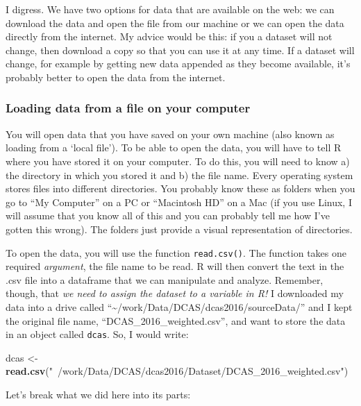 \documentclass[]{article}
\newenvironment{Shaded}{\begin{snugshade}}{\end{snugshade}}
\newcommand{\KeywordTok}[1]{\textcolor[rgb]{0.13,0.29,0.53}{\textbf{{#1}}}}
\newcommand{\StringTok}[1]{\textcolor[rgb]{0.31,0.60,0.02}{{#1}}}
\newcommand{\NormalTok}[1]{{#1}}
\begin{document}
I digress. We have two options for data that are available on the web:
we can download the data and open the file from our machine or we can
open the data directly from the internet. My advice would be this: if
you a dataset will not change, then download a copy so that you can use
it at any time. If a dataset will change, for example by getting new
data appended as they become available, it's probably better to open the
data from the internet.

\hypertarget{data_local}{\subsubsection{Loading data from a file on your
computer}\label{data_local}}

You will open data that you have saved on your own machine (also known
as loading from a `local file'). To be able to open the data, you will
have to tell R where you have stored it on your computer. To do this,
you will need to know a) the directory in which you stored it and b) the
file name. Every operating system stores files into different
directories. You probably know these as folders when you go to ``My
Computer'' on a PC or ``Macintosh HD'' on a Mac (if you use Linux, I
will assume that you know all of this and you can probably tell me how
I've gotten this wrong). The folders just provide a visual
representation of directories.

To open the data, you will use the function \texttt{read.csv()}. The
function takes one required \emph{argument}, the file name to be read. R
will then convert the text in the .csv file into a dataframe that we can
manipulate and analyze. Remember, though, that \emph{we need to assign
the dataset to a variable in R!} I downloaded my data into a drive
called ``\textasciitilde{}/work/Data/DCAS/dcas2016/sourceData/'' and I
kept the original file name, ``DCAS\_2016\_weighted.csv'', and want to
store the data in an object called \texttt{dcas}. So, I would write:

\begin{Shaded}
\begin{Highlighting}[]
\NormalTok{dcas <-}\StringTok{ }\KeywordTok{read.csv}\NormalTok{(}\StringTok{"~/work/Data/DCAS/dcas2016/Dataset/DCAS_2016_weighted.csv"}\NormalTok{)}
\end{Highlighting}
\end{Shaded}

Let's break what we did here into its parts:
\end{document}
